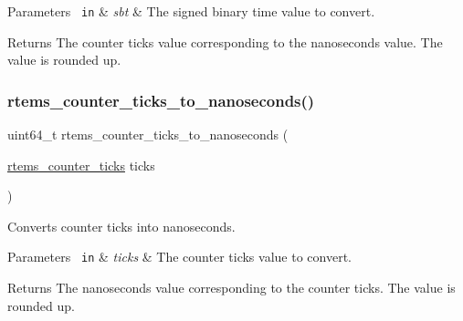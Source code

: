 \begin{DoxyParams}[1]{Parameters}
\mbox{\texttt{ in}}  & {\em sbt} & The signed binary time value to convert.\\
\hline
\end{DoxyParams}
\begin{DoxyReturn}{Returns}
The counter ticks value corresponding to the nanoseconds value. The value is rounded up. 
\end{DoxyReturn}
\mbox{\label{group__ClassicCounter_ga3e50a042e60bfcafdff5dbd46cad8947}} 
\subsubsection{\texorpdfstring{rtems\_counter\_ticks\_to\_nanoseconds()}{rtems\_counter\_ticks\_to\_nanoseconds()}}
{\footnotesize\ttfamily uint64\+\_\+t rtems\+\_\+counter\+\_\+ticks\+\_\+to\+\_\+nanoseconds (\begin{DoxyParamCaption}\item[{\mbox{\hyperlink{group__ClassicCounter_gafda796220404920ac0af841d9f555262}{rtems\+\_\+counter\+\_\+ticks}}}]{ticks }\end{DoxyParamCaption})}



Converts counter ticks into nanoseconds. 


\begin{DoxyParams}[1]{Parameters}
\mbox{\texttt{ in}}  & {\em ticks} & The counter ticks value to convert.\\
\hline
\end{DoxyParams}
\begin{DoxyReturn}{Returns}
The nanoseconds value corresponding to the counter ticks. The value is rounded up. 
\end{DoxyReturn}
\mbox{\label{group__ClassicCounter_ga57c10408f9570d199408745197f014de}} 
